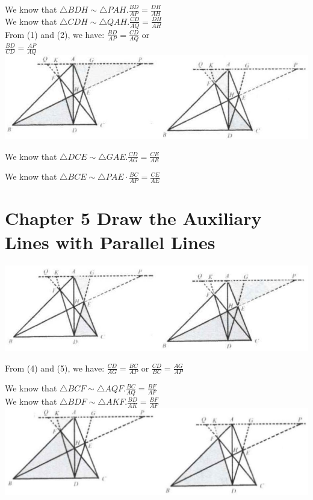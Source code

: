 \documentclass[10pt]{article}
\begin{document}
We know that \(\triangle B D H \sim \triangle P A H . \frac{B D}{A P}=\frac{D H}{A H}\)\\
We know that \(\triangle C D H \sim \triangle Q A H . \frac{C D}{A Q}=\frac{D H}{A H}\)\\
From (1) and (2), we have: \(\frac{B D}{A P}=\frac{C D}{A Q}\) or\\
\(\frac{B D}{C D}=\frac{A P}{A Q}\)\\
\includegraphics[max width=\textwidth, center]{2025_04_17_97bc1f7e44d93c271a88g-124(3)}

We know that \(\triangle D C E \sim \triangle G A E . \frac{C D}{A G}=\frac{C E}{A E}\)

We know that \(\triangle B C E \sim \triangle P A E \cdot \frac{B C}{A P}=\frac{C E}{A E}\)

\section*{Chapter 5 Draw the Auxiliary Lines with Parallel Lines}
\begin{center}
\includegraphics[max width=\textwidth]{2025_04_17_97bc1f7e44d93c271a88g-125(1)}
\end{center}

From (4) and (5), we have: \(\frac{C D}{A G}=\frac{B C}{A P}\) or \(\frac{C D}{B C}=\frac{A G}{A P}\)

We know that \(\triangle B C F \sim \triangle A Q F . \frac{B C}{A Q}=\frac{B F}{A F}\)\\
We know that \(\triangle B D F \sim \triangle A K F . \frac{B D}{A K}=\frac{B F}{A F}\)\\
\includegraphics[max width=\textwidth, center]{2025_04_17_97bc1f7e44d93c271a88g-125}
\end{document}
